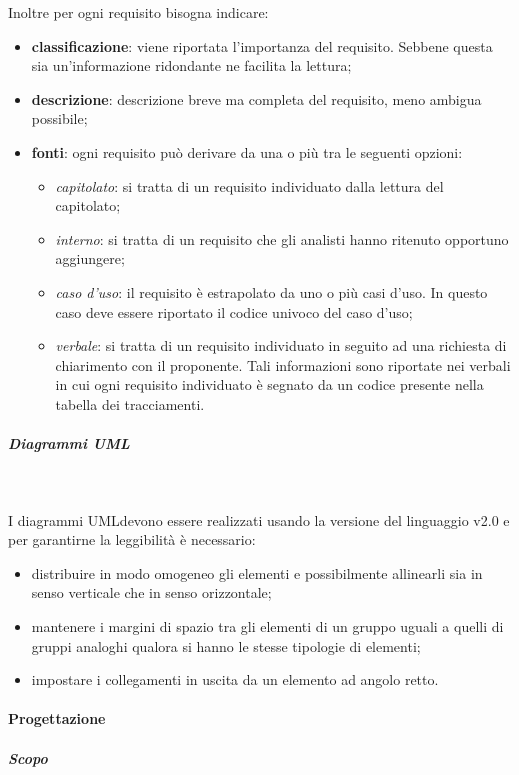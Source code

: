 \noindent
Inoltre per ogni requisito bisogna indicare:	
	\begin{itemize}		
		\item \textbf{classificazione}: viene riportata l'importanza del requisito. 
			Sebbene questa sia un'informazione ridondante ne facilita la lettura;
		\item \textbf{descrizione}: descrizione breve ma completa del requisito, 
			meno ambigua possibile;
		\item \textbf{fonti}: ogni requisito può derivare da una o più tra le 
		seguenti opzioni:
		\begin{itemize}
			\item \textit{capitolato\glo}: si tratta di un requisito individuato dalla 
				lettura del capitolato\glo;
			\item \textit{interno}: si tratta di un requisito che gli analisti hanno 
				ritenuto opportuno aggiungere;
			\item \textit{caso d'uso}: il requisito è estrapolato da uno o più casi 
				d'uso. In questo caso deve essere riportato il codice univoco del caso d'uso;
			\item \textit{verbale}: si tratta di un requisito individuato in seguito ad 
				una richiesta di chiarimento con il proponente. Tali informazioni sono riportate 
				nei verbali in cui ogni requisito individuato è segnato da un codice presente 
				nella tabella dei tracciamenti. \\
		\end{itemize}
	\end{itemize}

\subparagraph{Diagrammi UML} \mbox{}\\ \label{sec:UML}

I diagrammi UML\glosp devono essere realizzati usando la versione del 
linguaggio v2.0 e per garantirne la leggibilità è necessario:
	\begin{itemize}
		\item distribuire in modo omogeneo gli elementi e possibilmente allinearli 
			sia in senso verticale che in senso orizzontale;
		\item mantenere i margini di spazio tra gli elementi di un gruppo uguali a 
			quelli di gruppi analoghi qualora si hanno le stesse tipologie di elementi;
		\item impostare i collegamenti in uscita da un elemento ad angolo retto. 
	\end{itemize}

\paragraph{Progettazione} 
\subparagraph{Scopo} \mbox{}\\

